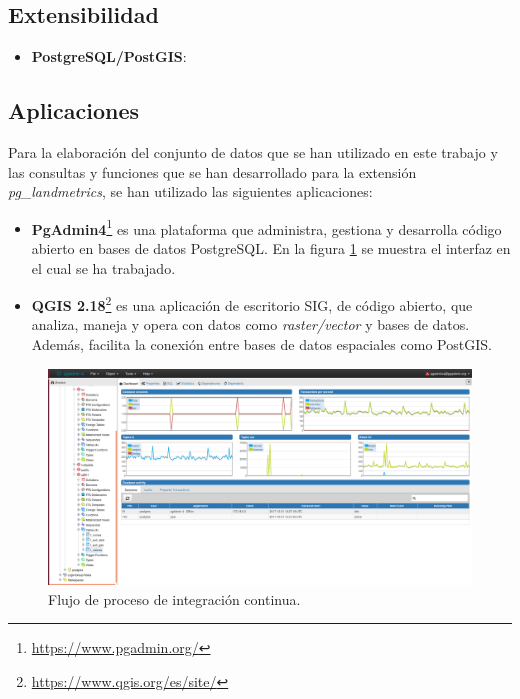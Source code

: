 \subsection{Extensibilidad}\label{subsec:exten}



\begin{itemize}
\item\textbf{PostgreSQL/PostGIS}: 
\end{itemize}


\subsection{Aplicaciones}\label{subsec:aplic}

Para la elaboración del conjunto de datos que se han utilizado en este trabajo y las consultas y funciones que se han desarrollado para la extensión \textit{pg\_landmetrics}, se han utilizado las siguientes aplicaciones:

\begin{itemize}
\item\textbf{PgAdmin4}\footnote{\url{https://www.pgadmin.org/}} es una plataforma que administra, gestiona y desarrolla código abierto en bases de datos PostgreSQL. En la figura \ref{fig:carga} se muestra el interfaz en el cual se ha trabajado.
\item\textbf{QGIS 2.18}\footnote{\url{https://www.qgis.org/es/site/}} es una aplicación de escritorio SIG, de código abierto, que analiza, maneja y opera con datos como \textit{raster/vector} y bases de datos. Además, facilita la conexión entre bases de datos espaciales como PostGIS.
\end{itemize}

\begin{figure}
\begin{center}
\includegraphics[width=\textwidth]{Metodologia/Figs/carga-siose-2011.png}
\caption{Flujo de proceso de integración continua. \label{fig:carga}}
\end{center}
\end{figure}


